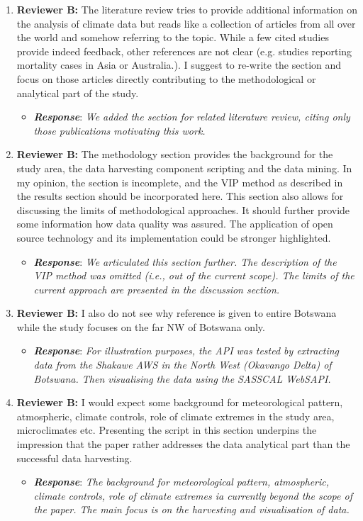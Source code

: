 \documentclass[a4paper, 12pt, conference]{ieeeconf}      %
\begin{document}
\begin{enumerate}
	\item \textbf{Reviewer B:} The literature review tries to provide additional information on the analysis of climate data but reads like a collection of articles from all over the world and somehow referring to the topic. While a few cited studies provide indeed feedback, other references are not clear (e.g. studies reporting mortality cases in Asia or Australia.). I suggest to re-write the section and focus on those articles directly contributing to the methodological or analytical part of the study.
		\begin{itemize}
		\item \textbf{\emph{Response}}: \emph{We added the section for related  literature review, citing only those publications motivating this work.}
	\end{itemize}

	\item  \textbf{Reviewer B:} The methodology section provides the background for the study area, the data harvesting component scripting and the data mining. In my opinion, the section is incomplete, and the VIP method as described in the results section should be incorporated here. This section also allows for discussing the limits of methodological approaches. It should further provide some information how data quality was assured. The application of open source technology and its implementation could be stronger highlighted.
	\begin{itemize}
		\item \textbf{\emph{Response}}: \emph{We articulated this section further. The description of the VIP method was omitted (i.e., out of the current scope). The limits of the current approach are presented in the discussion section.}
	\end{itemize}
	
	
	\item \textbf{Reviewer B:}  I also do not see why reference is given to entire Botswana while the study focuses on the far NW of Botswana only. 
	\begin{itemize}
		\item \textbf{\emph{Response}}: \emph{For illustration purposes, the API  was  tested by extracting  data from  the Shakawe AWS in the North West (Okavango Delta) of Botswana. Then visualising the data using the SASSCAL WebSAPI.}
	\end{itemize}
	
	\item \textbf{Reviewer B:}  I would expect some background for meteorological pattern, atmospheric, climate controls, role of climate extremes in the study area, microclimates etc. Presenting the script in this section underpins the impression that the paper rather addresses the data analytical part than the successful data harvesting.
	\begin{itemize}
		\item \textbf{\emph{Response}}: \emph{ The background for meteorological pattern, atmospheric, climate controls, role of climate extremes ia currently beyond the scope of the paper. The main focus is on the harvesting and visualisation of data.}
	\end{itemize}


\end{enumerate}
\end{document}
